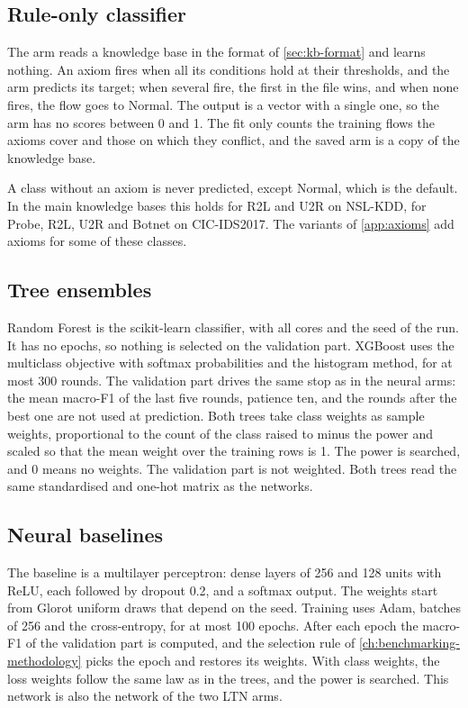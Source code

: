 \subsection{Rule-only classifier}
\label{sec:impl-rules}

The arm reads a knowledge base in the format of \cref{sec:kb-format} and learns nothing. An axiom
fires when all its conditions hold at their thresholds, and the arm predicts its target; when
several fire, the first in the file wins, and when none fires, the flow goes to Normal. The output
is a vector with a single one, so the arm has no scores between 0 and 1. The fit only counts the
training flows the axioms cover and those on which they conflict, and the saved arm is a copy of
the knowledge base.

A class without an axiom is never predicted, except Normal, which is the default. In the main
knowledge bases this holds for R2L and U2R on NSL-KDD, for Probe, R2L, U2R and Botnet on
CIC-IDS2017. The variants of \cref{app:axioms}
add axioms for some of these classes.

\subsection{Tree ensembles}
\label{sec:impl-trees}

Random Forest is the scikit-learn classifier, with all cores and the seed of the run. It has no
epochs, so nothing is selected on the validation part. XGBoost uses the multiclass objective
with softmax probabilities and the histogram method, for at most 300 rounds. The validation part
drives the same stop as in the neural arms: the mean macro-F1 of the last five rounds, patience
ten, and the rounds after the best one are not used at prediction. Both trees take class weights
as sample weights, proportional to the count of the class raised to minus the power and scaled
so that the mean weight over the training rows is 1. The power is searched, and 0 means no
weights. The validation part is not weighted. Both trees read the same standardised and one-hot
matrix as the networks.

\subsection{Neural baselines}
\label{sec:impl-mlp}

The baseline is a multilayer perceptron: dense layers of 256 and 128 units with ReLU, each
followed by dropout 0.2, and a softmax output. The weights start from Glorot uniform draws that
depend on the seed. Training uses Adam, batches of 256 and the cross-entropy, for at most 100
epochs. After each epoch the macro-F1 of the validation part is computed, and the selection
rule of \cref{ch:benchmarking-methodology} picks the epoch and restores its weights. With class
weights, the loss weights follow the same law as in the trees, and the power is searched. This
network is also the network of the two LTN arms.

